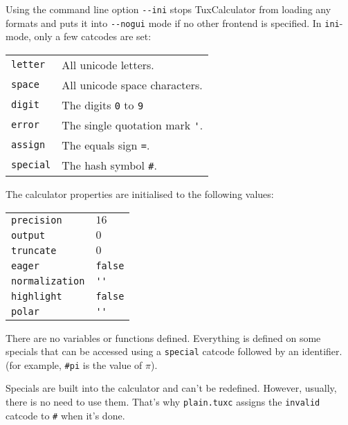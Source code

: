 \documentclass[10pt]{article}
\begin{document}
    Using the command line option \verb|--ini| stops TuxCalculator from loading any formats and puts it into \verb|--nogui| mode if no other frontend is specified.
    In \texttt{ini}-mode, only a few catcodes are set:
    \begin{center}
        \begin{tabular}{p{}p{}}
            \verb|letter|  & All unicode letters.                \\
            \verb|space|   & All unicode space characters.       \\
            \verb|digit|   & The digits \verb|0| to \verb|9|     \\
            \verb|error|   & The single quotation mark \verb|'|. \\
            \verb|assign|  & The equals sign \verb|=|.           \\
            \verb|special| & The hash symbol \verb|#|.           \\
        \end{tabular}
    \end{center}
    
    The calculator properties are initialised to the following values:
    \begin{center}
        \begin{tabular}{p{}p{}}
            \verb|precision|     & $ 16 $       \\
            \verb|output|        & $ 0 $        \\
            \verb|truncate|      & $ 0 $        \\
            \verb|eager|         & \verb|false| \\
            \verb|normalization| & \verb|''|    \\
            \verb|highlight|     & \verb|false| \\
            \verb|polar|         & \verb|''|    \\
        \end{tabular}
    \end{center}
    
    There are no variables or functions defined.
    Everything is defined on some specials that can be accessed using a \verb|special| catcode followed by an identifier.
    (for example, \verb|#pi| is the value of $ \pi $).
    
    Specials are built into the calculator and can't be redefined.
    However, usually, there is no need to use them.
    That's why \verb|plain.tuxc| assigns the \verb|invalid| catcode to \verb|#| when it's done.
    
\end{document}
